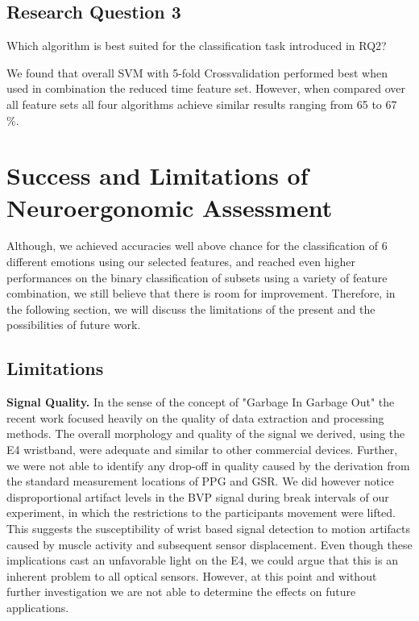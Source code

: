 \subsection{Research Question 3}  
Which algorithm is best suited for the classification task introduced in RQ2?

We found that overall SVM with 5-fold Crossvalidation performed best when used in combination the reduced time feature set. However, when compared over all feature sets all four algorithms achieve similar results ranging from 65 to 67 \%.

\section{Success and Limitations of Neuroergonomic Assessment}
Although, we achieved accuracies well above chance for the classification of 6 different emotions using our selected features, and reached even higher performances on the binary classification of subsets using a variety of feature combination, we still believe that there is room for improvement. Therefore, in the following section, we will discuss the limitations of the present and the possibilities of future work.

\subsection{Limitations}
\textbf{Signal Quality.}
In the sense of the concept of "Garbage In Garbage Out" the recent work focused heavily on the quality of data extraction and processing methods. The overall morphology and quality of the signal we derived, using the E4 wristband, were adequate and similar to other commercial devices. Further, we were not able to identify any drop-off in quality caused by the derivation from the standard measurement locations of PPG and GSR. We did however notice disproportional artifact levels in the BVP signal during break intervals of our experiment, in which the restrictions to the participants movement were lifted. This suggests the susceptibility of wrist based signal detection to motion artifacts caused by muscle activity and subsequent sensor displacement. Even though these implications cast an unfavorable light on the E4, we could argue that this is an inherent problem to all optical sensors. However, at this point and without further investigation we are not able to determine the effects on future applications.\\[10pt]

